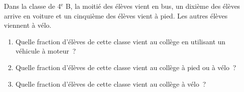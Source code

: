 \documentclass[exercice]{thedocument}%
\begin{document}
%
    Dans la classe de 4$^{\text{e}}$ B, la moitié des élèves vient en bus, un
    dixième des élèves arrive en voiture et un cinquième des élèves vient à pied.
    Les autres élèves viennent à vélo.
    \begin{enumerate}
        \item Quelle fraction d'élèves de cette classe vient au collège en
        utilisant un véhicule à moteur~?
        \item Quelle fraction d'élèves de cette classe vient au collège à pied
        ou à vélo~?
        \item Quelle fraction d'élèves de cette classe vient au collège à vélo~?
    \end{enumerate}
\end{document}
